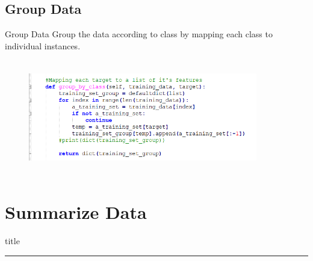 \documentclass{beamer}
\begin{document}
\subsection{Group Data}
    \begin{frame}{Group Data}
        \hspace{0.5cm} Group the data according to class by mapping each class to individual instances.
        \begin{center}
            \begin{figure}
                \begin{center}
                    \includegraphics[width = 10cm, height = 5cm]{Theme/images/group.PNG}
                \end{center}
            \end{figure}
        \end{center}
    \end{frame}

\section{Summarize Data}
    \begin{frame}[plain]
        \vfill
      \centering
      \begin{beamercolorbox}[sep=8pt,center,shadow=true,rounded=true]{title}
        \insertsectionhead\par%
        \color{oxfordblue}\noindent\rule{10cm}{1pt} \\
        \LARGE{\faFileTextO}
      \end{beamercolorbox}
      \vfill
  \end{frame}
  
\end{document}
